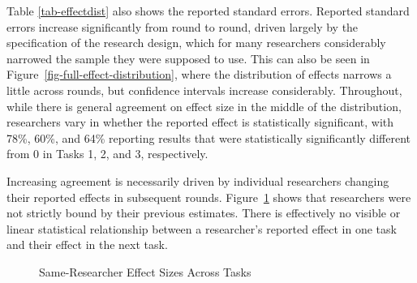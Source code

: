\documentclass[
  letterpaper,
  DIV=11,
  numbers=noendperiod]{scrartcl}
\begin{document}
Table \ref{tab-effectdist} also shows the reported standard errors.
Reported standard errors increase significantly from round to round,
driven largely by the specification of the research design, which for
many researchers considerably narrowed the sample they were supposed to
use. This can also be seen in Figure~\ref{fig-full-effect-distribution},
where the distribution of effects narrows a little across rounds, but
confidence intervals increase considerably. Throughout, while there is
general agreement on effect size in the middle of the distribution,
researchers vary in whether the reported effect is statistically
significant, with 78\%, 60\%, and 64\% reporting results that were
statistically significantly different from 0 in Tasks 1, 2, and 3,
respectively.

Increasing agreement is necessarily driven by individual researchers
changing their reported effects in subsequent rounds.
Figure~\ref{fig-effects-compare-rounds} shows that researchers were not
strictly bound by their previous estimates. There is effectively no
visible or linear statistical relationship between a researcher's
reported effect in one task and their effect in the next task.

\begin{figure}


\caption{\label{fig-effects-compare-rounds}Same-Researcher Effect Sizes
Across Tasks}

\end{figure}%
\end{document}
